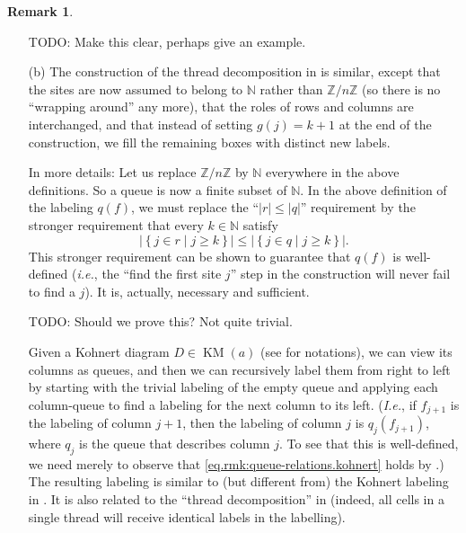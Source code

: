 \documentclass[reqno]{amsart}
\newcommand{\0}{\phantom{c}}
\newcommand{\ZZ}{\mathbb{Z}}
\newcommand{\NN}{\mathbb{N}}
\newcommand{\set}[1]{\left\{ #1 \right\}}
\newcommand{\abs}[1]{\left| #1 \right|}
\newcommand{\tup}[1]{\left( #1 \right)}
\theoremstyle{plain}
\theoremstyle{definition}
\newtheorem{remark}[thm]{Remark}
\numberwithin{equation}{section}
\begin{document}
\begin{remark}
\begin{enumerate}
TODO: Make this clear, perhaps give an example.

\item[(b)] The construction of the thread decomposition in \cite[Definition 3.5]{AssSea18} is similar, except that the sites are now assumed to belong to $\NN$ rather than $\ZZ / n \ZZ$ (so there is no ``wrapping around'' any more), that the roles of rows and columns are interchanged, and that instead of setting $g \tup{j} = k+1$ at the end of the construction, we fill the remaining boxes with distinct new labels.

In more details: Let us replace $\ZZ / n \ZZ$ by $\NN$ everywhere in the above definitions.
So a queue is now a finite subset of $\NN$.
In the above definition of the labeling $q \tup{f}$, we must replace the ``$\abs{r} \leq \abs{q}$'' requirement by the stronger requirement that every $k \in \NN$ satisfy
\begin{equation}
\abs{\set{ j \in r \mid j \geq k } } \leq \abs{\set{ j \in q \mid j \geq k } } .
\label{eq.rmk:queue-relations.kohnert}
\end{equation}
This stronger requirement can be shown to guarantee that $q \tup{f}$ is well-defined (\textit{i.e.}, the ``find the first site $j$'' step in the construction will never fail to find a $j$).
It is, actually, necessary and sufficient.

TODO: Should we prove this? Not quite trivial.

Given a Kohnert diagram $D \in \operatorname{KM}\tup{a}$ (see \cite{AssSea18} for notations), we can view its columns as queues, and then we can recursively label them from right to left by starting with the trivial labeling of the empty queue and applying each column-queue to find a labeling for the next column to its left.
(\textit{I.e.}, if $f_{j+1}$ is the labeling of column $j+1$, then the labeling of column $j$ is $q_j (f_{j+1})$, where $q_j$ is the queue that describes column $j$. To see that this is well-defined, we need merely to observe that \eqref{eq.rmk:queue-relations.kohnert} holds by \cite[Lemma 2.2]{AssSea18}.)
The resulting labeling is similar to (but different from) the Kohnert labeling in \cite[Definition 2.5]{AssSea18}. It is also related to the ``thread decomposition'' in \cite[Definition 3.5]{AssSea18} (indeed, all cells in a single thread will receive identical labels in the labelling).
\end{enumerate}
\end{remark}
\end{document}
